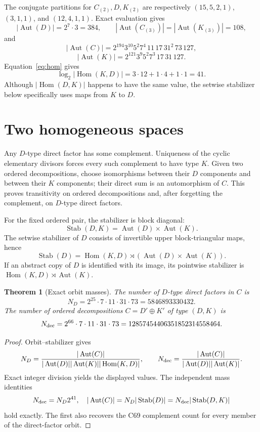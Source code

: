 \documentclass[10pt]{article}
\newtheorem{theorem}{Theorem}
\newcommand{\Aut}{\operatorname{Aut}}
\newcommand{\Hom}{\operatorname{Hom}}
\newcommand{\Stab}{\operatorname{Stab}}
\begin{document}
The conjugate partitions for $C_{(2)},D,K_{(2)}$ are respectively
$(15,5,2,1)$, $(3,1,1)$, and $(12,4,1,1)$.  Exact evaluation gives
\[
 |\Aut(D)|=2^7\cdot3=384,\qquad |\Aut(C_{(3)})|=|\Aut(K_{(3)})|=108,
\]
and
\[
 |\Aut(C)|=2^{194}3^{10}5^2 7^4\,11\,17\,31^2\,73\,127,
\]
\[
 |\Aut(K)|=2^{121}3^9 5^2 7^3\,17\,31\,127.
\]
Equation~\eqref{eq:hom} gives
\[
 \log_2|\Hom(K,D)|=3\cdot12+1\cdot4+1\cdot1=41.
\]
Although $|\Hom(D,K)|$ happens to have the same value, the setwise stabilizer
below specifically uses maps from $K$ to $D$.

\section{Two homogeneous spaces}
Any $D$-type direct factor has some complement.  Uniqueness of the cyclic
elementary divisors forces every such complement to have type $K$.  Given two
ordered decompositions, choose isomorphisms between their $D$ components and
between their $K$ components; their direct sum is an automorphism of $C$.
This proves transitivity on ordered decompositions and, after forgetting the
complement, on $D$-type direct factors.

For the fixed ordered pair, the stabilizer is block diagonal:
\[
 \Stab(D,K)=\Aut(D)\times\Aut(K).
\]
The setwise stabilizer of $D$ consists of invertible upper block-triangular
maps, hence
\[
 \Stab(D)=\Hom(K,D)\rtimes(\Aut(D)\times\Aut(K)).
\]
If an abstract copy of $D$ is identified with its image, its pointwise
stabilizer is $\Hom(K,D)\rtimes\Aut(K)$.

\begin{theorem}[Exact orbit masses]
The number of $D$-type direct factors in $C$ is
\[
 N_D=2^{25}\cdot7\cdot11\cdot31\cdot73=5846893330432.
\]
The number of ordered decompositions $C=D'\oplus K'$ of type $(D,K)$ is
\[
 N_{\rm dec}=2^{66}\cdot7\cdot11\cdot31\cdot73
 =12857454406351852314558464.
\]
\end{theorem}

\begin{proof}
Orbit--stabilizer gives
\[
 N_D=\frac{|\Aut(C)|}{|\Aut(D)||\Aut(K)||\Hom(K,D)|},\qquad
 N_{\rm dec}=\frac{|\Aut(C)|}{|\Aut(D)||\Aut(K)|}.
\]
Exact integer division yields the displayed values.  The independent mass
identities
\[
 N_{\rm dec}=N_D2^{41},\quad
 |\Aut(C)|=N_D|\Stab(D)|=N_{\rm dec}|\Stab(D,K)|
\]
hold exactly.  The first also recovers the C69 complement count for every
member of the direct-factor orbit.
\end{proof}
\end{document}
